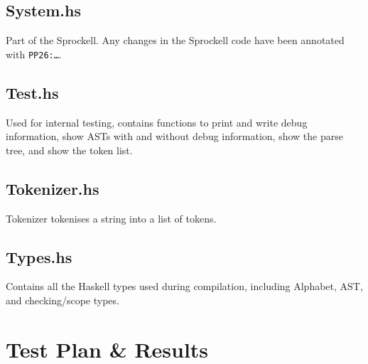 \documentclass[twoside]{report}
\begin{document}
\section{System.hs}
Part of the Sprockell. Any changes in the Sprockell code have been annotated with \texttt{PP26:\ldots}.

\section{Test.hs}
Used for internal testing, contains functions to print and write debug information, show ASTs with and without debug information, show the parse tree, and show the token list.

\section{Tokenizer.hs}
Tokenizer tokenises a string into a list of tokens.

\section{Types.hs}
Contains all the Haskell types used during compilation, including Alphabet, AST, and checking/scope types.



\chapter{Test Plan \& Results}
\label{test_plan_and_results}
\end{document}
